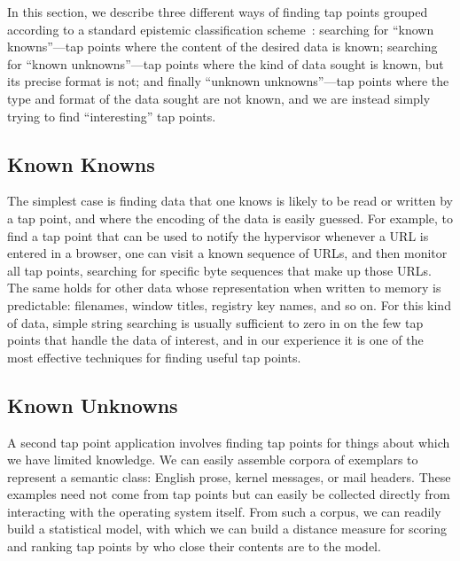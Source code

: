 In this section, we describe three different ways of finding tap points
grouped according to a standard epistemic classification
scheme~\cite{Rumsfeld:2002}: searching for ``known knowns''---tap points
where the content of the desired data is known; searching for ``known
unknowns''---tap points where the kind of data sought is known, but its
precise format is not; and finally ``unknown unknowns''---tap points
where the type and format of the data sought are not known, and we are
instead simply trying to find ``interesting'' tap points.

\subsection{Known Knowns}

The simplest case is finding data that one knows is likely to be read or
written by a tap point, and where the encoding of the data is easily
guessed. For example, to find a tap point that can be used to notify
the hypervisor whenever a URL is entered in a browser, one can visit a
known sequence of URLs, and then monitor all tap points, searching for
specific byte sequences that make up those URLs. The same holds for
other data whose representation when written to memory is predictable:
filenames, window titles, registry key names, and so on. For this kind
of data, simple string searching is usually sufficient to zero in on the
few tap points that handle the data of interest, and in our experience
it is one of the most effective techniques for finding useful tap
points.

\subsection{Known Unknowns}
\label{sec:technical:subsec:knownunk}

A second tap point application involves finding tap points for things
about which we have limited knowledge.
We can easily assemble corpora of exemplars to represent a semantic
class: English prose, kernel messages, or mail headers. These examples
need not come from tap points but can easily be collected directly from
interacting with the operating system itself. From such a corpus, we can
readily build a statistical model, with which we can build a distance
measure for scoring and ranking tap points by who close their contents
are to the model.




